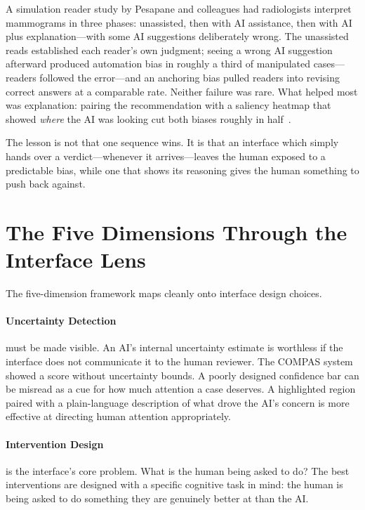 \begin{examplebox}
A simulation reader study by Pesapane and colleagues had radiologists interpret mammograms in three phases: unassisted, then with AI assistance, then with AI plus explanation---with some AI suggestions deliberately wrong. The unassisted reads established each reader's own judgment; seeing a wrong AI suggestion afterward produced automation bias in roughly a third of manipulated cases---readers followed the error---and an anchoring bias pulled readers into revising correct answers at a comparable rate. Neither failure was rare. What helped most was explanation: pairing the recommendation with a saliency heatmap that showed \emph{where} the AI was looking cut both biases roughly in half~\autocite{pesapane2026cognitive}.

The lesson is not that one sequence wins. It is that an interface which simply hands over a verdict---whenever it arrives---leaves the human exposed to a predictable bias, while one that shows its reasoning gives the human something to push back against.
\end{examplebox}

\section{The Five Dimensions Through the Interface Lens}
\label{sec:ch6-five-dimensions}

The five-dimension framework maps cleanly onto interface design choices.

\paragraph{Uncertainty Detection} must be made visible. An AI's internal uncertainty estimate is worthless if the interface does not communicate it to the human reviewer. The COMPAS system showed a score without uncertainty bounds. A poorly designed confidence bar can be misread as a cue for how much attention a case deserves. A highlighted region paired with a plain-language description of what drove the AI's concern is more effective at directing human attention appropriately.

\paragraph{Intervention Design} is the interface's core problem. What is the human being asked to do? The best interventions are designed with a specific cognitive task in mind: the human is being asked to do something they are genuinely better at than the AI.

